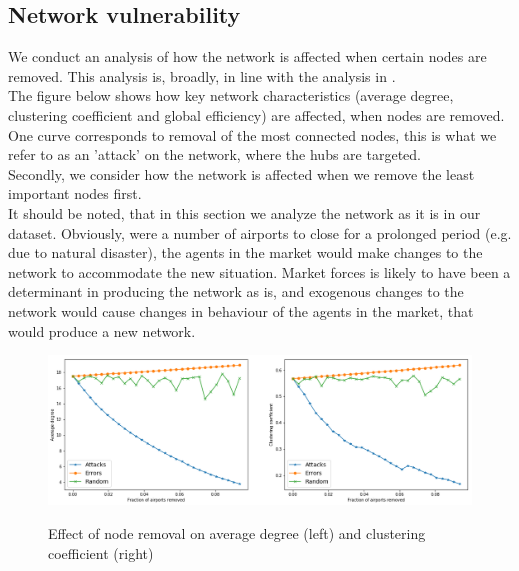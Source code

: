\subsection{Network vulnerability}
We conduct an analysis of how the network is affected when certain nodes are removed. This analysis is, broadly, in line with the analysis in \cite{chi2004structural}. \\
The figure below shows how key network characteristics (average degree, clustering coefficient and global efficiency) are affected, when nodes are removed. One curve corresponds to removal of the most connected nodes, this is what we refer to as an 'attack' on the network, where the hubs are targeted. \\
Secondly, we consider how the network is affected when we remove the least important nodes first. \\
It should be noted, that in this section we analyze the network as it is in our dataset. Obviously, were a number of airports to close for a prolonged period (e.g. due to natural disaster), the agents in the market would make changes to the network to accommodate the new situation. Market forces is likely to have been a determinant in producing the network as is, and exogenous changes to the network would cause changes in behaviour of the agents in the market, that would produce a new network. \\ 

\begin{figure}[H]
  \centering
  \caption{Effect of node removal on average degree (left) and clustering coefficient (right)}
    \includegraphics[width=1. \textwidth]{Exam/Figures/attacksanderrors.png}
  \label{fig:attacks_and_errors}
\end{figure}

